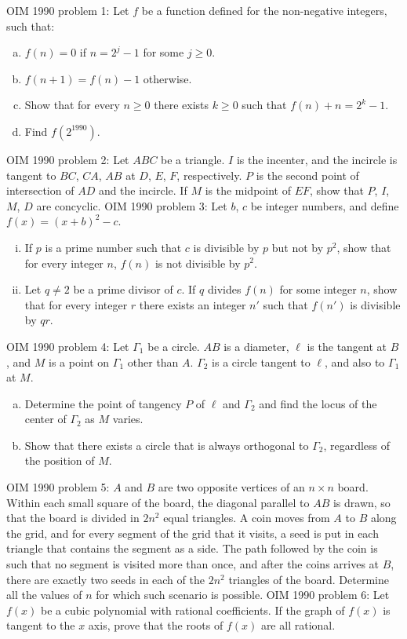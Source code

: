 OIM 1990 problem 1:  Let $f$ be a function defined for the non-negative integers, such that:
\begin{enumerate}[a)]
  \item $f(n)=0$ if $n=2^j-1$ for some $j \geq 0$.
  \item $f(n+1)=f(n)-1$ otherwise.
  \item Show that for every $n \geq 0$ there exists $k \geq 0$ such that $f(n)+n=2^k-1$.
  \item Find $f(2^{1990})$.
\end{enumerate} 
OIM 1990 problem 2:  Let $ABC$ be a triangle. $I$ is the incenter, and the incircle is tangent to $BC$, $CA$, $AB$ at $D$, $E$, $F$, respectively. $P$ is the second point of intersection of $AD$ and the incircle. If $M$ is the midpoint of $EF$, show that $P$, $I$, $M$, $D$ are concyclic. 
OIM 1990 problem 3:  Let $b$, $c$ be integer numbers, and define $f(x)=(x+b)^2-c$.
\begin{enumerate}[i)]
  \item If $p$ is a prime number such that $c$ is divisible by $p$ but not by $p^2$, show that for every integer $n$, $f(n)$ is not divisible by $p^2$.
  \item Let $q \neq 2$ be a  prime divisor of $c$. If $q$ divides $f(n)$ for some integer $n$, show that for every integer $r$ there exists an integer $n'$ such that $f(n')$ is divisible by $qr$.
\end{enumerate} 
OIM 1990 problem 4:  Let $\Gamma_1$ be a circle. $AB$ is a diameter, $\ell$ is the tangent at $B$, and $M$ is a point on $\Gamma_1$ other than $A$. $\Gamma_2$ is a circle tangent to $\ell$, and also to $\Gamma_1$ at $M$.
\begin{enumerate}[a)]
  \item Determine the point of tangency $P$ of $\ell$ and $\Gamma_2$ and find the locus of the center of $\Gamma_2$ as $M$ varies.
  \item Show that there exists a circle that is always orthogonal to $\Gamma_2$, regardless of the position of $M$.
\end{enumerate} 
OIM 1990 problem 5:  $A$ and $B$ are two opposite vertices of an $n \times n$ board. Within each small square of the board, the diagonal parallel to $AB$ is drawn, so that the board is divided in $2n^2$ equal triangles. A coin moves from $A$ to $B$ along the grid, and for every segment of the grid that it visits, a seed is put in each triangle that contains the segment as a side. The path followed by the coin is such that no segment is visited more than once, and after the coins arrives at $B$, there are exactly two seeds in each of the $2n^2$ triangles of the board. Determine all the values of $n$ for which such scenario is possible. 
OIM 1990 problem 6:  Let $f(x)$ be a cubic polynomial with rational coefficients. If the graph of $f(x)$ is tangent to the $x$ axis, prove that the roots of $f(x)$ are all rational. 

